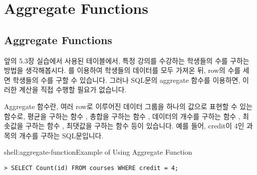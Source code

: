 \section{Aggregate Functions}\label{sect:aggregate-functions}

\subsection*{Aggregate Functions}

앞의 5.3장 실습에서 사용된 테이블에서, 특정 강의를 수강하는 학생들의 수를 구하는 방법을 생각해봅시다. 를 이용하여 학생들의 데이터를 모두 가져온 뒤, row의 수를 세면 학생들의 수를 구할 수 있습니다. 그러나 SQL문의 aggregate 함수를 이용하면, 이러한 계산을 직접 수행할 필요가 없습니다.

Aggregate 함수란, 여러 row로 이루어진 데이터 그룹을 하나의 값으로 표현할 수 있는 함수로, 평균을 구하는 함수 , 총합을 구하는 함수 , 데이터의 개수를 구하는 함수 , 최솟값을 구하는 함수 , 최댓값을 구하는 함수  등이 있습니다. 예를 들어, \은 credit이 4인 과목의 개수를 구하는 SQL문입니다.

\begin{shellenv}{shell:aggregate-function}{Example of Using Aggregate Function}\begin{verbatim}
> SELECT Count(id) FROM courses WHERE credit = 4;
\end{verbatim}
\end{shellenv}
